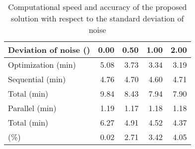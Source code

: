 \begin{table*}
  \centering
  \caption{
    Computational speed and accuracy of the proposed solution with respect to
    the standard deviation of noise
  }
  \ttfamily
  \begin{tabular}{lrrrr}
    \toprule
    \textnormal{Deviation of noise (\celsius{})} & 0.00 & 0.50 & 1.00 & 2.00 \\
    \midrule
    \textnormal{Optimization (min)}              & 5.08 & 3.73 & 3.34 & 3.19 \\
    \midrule
    \textnormal{Sequential (min)}                & 4.76 & 4.70 & 4.60 & 4.71 \\
    \textnormal{Total (min)}                     & 9.84 & 8.43 & 7.94 & 7.90 \\
    \midrule
    \textnormal{Parallel (min)}                  & 1.19 & 1.17 & 1.18 & 1.18 \\
    \textnormal{Total (min)}                     & 6.27 & 4.91 & 4.52 & 4.37 \\
    \midrule
    \textnormal{\up{NRMSE} (\%)}                 & 0.02 & 2.71 & 3.42 & 4.05 \\
    \bottomrule
  \end{tabular}
\end{table*}

